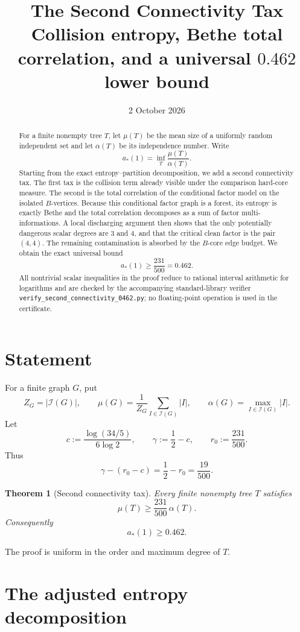 \documentclass[11pt]{article}
\title{The Second Connectivity Tax\\
\large Collision entropy, Bethe total correlation, and a universal $0.462$ lower bound}
\author{}
\date{2 October 2026}
\newtheorem{theorem}{Theorem}
\newcommand{\Ical}{\mathcal I}
\begin{document}
\maketitle

\begin{abstract}
For a finite nonempty tree $T$, let $\mu(T)$ be the mean size of a uniformly random independent set and let $\alpha(T)$ be its independence number.  Write
\[
 a_*(1)=\inf_T \frac{\mu(T)}{\alpha(T)}.
\]
Starting from the exact entropy--partition decomposition, we add a second connectivity tax.  The first tax is the collision term already visible under the comparison hard-core measure.  The second is the total correlation of the conditional factor model on the isolated $B$-vertices.  Because this conditional factor graph is a forest, its entropy is exactly Bethe and the total correlation decomposes as a sum of factor multi-informations.  A local discharging argument then shows that the only potentially dangerous scalar degrees are $3$ and $4$, and that the critical clean factor is the pair $(4,4)$.  The remaining contamination is absorbed by the $B$-core edge budget.  We obtain the exact universal bound
\[
 \boxed{a_*(1)\ge \frac{231}{500}=0.462.}
\]
All nontrivial scalar inequalities in the proof reduce to rational interval arithmetic for logarithms and are checked by the accompanying standard-library verifier
\texttt{verify\_second\_connectivity\_0462.py}; no floating-point operation is used in the certificate.
\end{abstract}

\section{Statement}

For a finite graph $G$, put
\[
 Z_G=|\Ical(G)|,
 \qquad
 \mu(G)=\frac1{Z_G}\sum_{I\in\Ical(G)}|I|,
 \qquad
 \alpha(G)=\max_{I\in\Ical(G)}|I|.
\]
Let
\[
 c:=\frac{\log(34/5)}{6\log2},
 \qquad
 \gamma:=\frac12-c,
 \qquad
 r_0:=\frac{231}{500}.
\]
Thus
\[
 \gamma-(r_0-c)=\frac12-r_0=\frac{19}{500}.
\]

\begin{theorem}[Second connectivity tax]\label{thm:main}
Every finite nonempty tree $T$ satisfies
\[
 \mu(T)\ge \frac{231}{500}\,\alpha(T).
\]
Consequently
\[
 \boxed{a_*(1)\ge0.462.}
\]
\end{theorem}

The proof is uniform in the order and maximum degree of $T$.

\section{The adjusted entropy decomposition}
\end{document}
